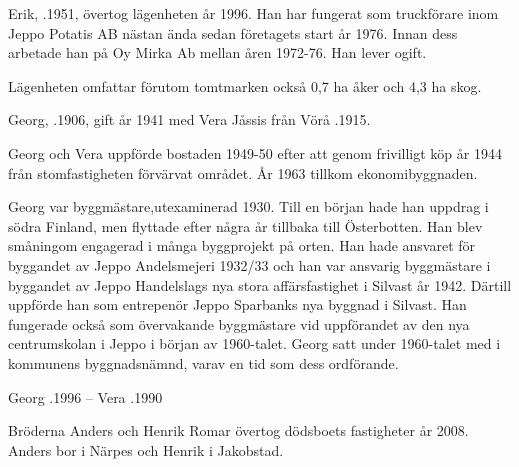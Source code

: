 

Erik, .1951, övertog lägenheten år 1996. Han har fungerat som truckförare inom Jeppo Potatis AB nästan ända sedan företagets start år 1976. Innan dess arbetade han på Oy Mirka Ab mellan åren 1972-76. Han lever ogift.

Lägenheten omfattar förutom tomtmarken också 0,7 ha åker och 4,3 ha skog.


Georg, .1906, gift år 1941 med Vera Jåssis från Vörå .1915.
\begin{jhchildren}
  \item {}
  \item {}
  \item {}
  \item {}
\end{jhchildren}

Georg och Vera uppförde bostaden 1949-50 efter att genom frivilligt köp år 1944 från stomfastigheten förvärvat området. År 1963 tillkom ekonomibyggnaden.

Georg var byggmästare,utexaminerad 1930. Till en början hade han uppdrag i södra Finland, men flyttade efter några år tillbaka till Österbotten. Han blev småningom engagerad i många byggprojekt på orten. Han hade ansvaret för byggandet av Jeppo Andelsmejeri 1932/33 och  han var ansvarig byggmästare i byggandet av Jeppo Handelslags nya stora affärsfastighet i Silvast år 1942. Därtill uppförde han som entrepenör Jeppo Sparbanks nya byggnad i Silvast. Han fungerade också som övervakande byggmästare vid uppförandet av den nya centrumskolan i Jeppo i början av 1960-talet. Georg satt under 1960-talet med i kommunens byggnadsnämnd, varav en tid som dess ordförande.

Georg .1996  --  Vera .1990



Bröderna Anders och Henrik Romar övertog dödsboets fastigheter år 2008. Anders bor i Närpes och Henrik i Jakobstad.



